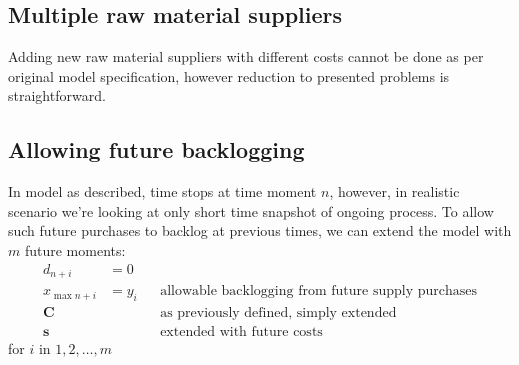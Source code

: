 \subsection{Multiple raw material suppliers}
\label{subs:Multiple raw material suppliers}
Adding new raw material suppliers with different costs cannot be done as per original model specification, however reduction to presented problems is straightforward.

\subsection{Allowing future backlogging}
\label{subs:Allowing future backlogging}
In model as described, time stops at time moment $n$, however, in realistic scenario we're looking at only short time snapshot of ongoing process. To allow such future purchases to backlog at previous times, we can extend the model with $m$ future moments:
\begin{align*}
    d_{n+i} &= 0  && \\
    x_{\max{n+i}} &= y_i  && \text{allowable backlogging from future supply purchases}\\
    \mathbf{C}  & && \text{as previously defined, simply extended} \\
    \mathbf{s} &&& \text{extended with future costs}
\end{align*}
for $i$ in $1, 2, \dotsc, m$
